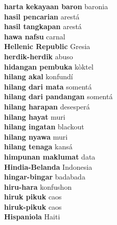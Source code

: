 \textbf{ harta kekayaan baron  } baronia \\
\textbf{ hasil pencarian  } arestá \\
\textbf{ hasil tangkapan  } arestá \\
\textbf{ hawa nafsu  } carnal \\
\textbf{ Hellenic Republic  } Gresia \\
\textbf{ herdik-herdik  } abuso \\
\textbf{ hidangan pembuka  } kòktel \\
\textbf{ hilang akal  } konfundí \\
\textbf{ hilang dari mata  } somentá \\
\textbf{ hilang dari pandangan  } somentá \\
\textbf{ hilang harapan  } desesperá \\
\textbf{ hilang hayat  } muri \\
\textbf{ hilang ingatan  } blackout \\
\textbf{ hilang nyawa  } muri \\
\textbf{ hilang tenaga  } kansá \\
\textbf{ himpunan maklumat  } data \\
\textbf{ Hindia-Belanda  } Indonesia \\
\textbf{ hingar-bingar  } badabada \\
\textbf{ hiru-hara  } konfushon \\
\textbf{ hiruk pikuk  } caos \\
\textbf{ hiruk-pikuk  } caos \\
\textbf{ Hispaniola  } Haiti \\
